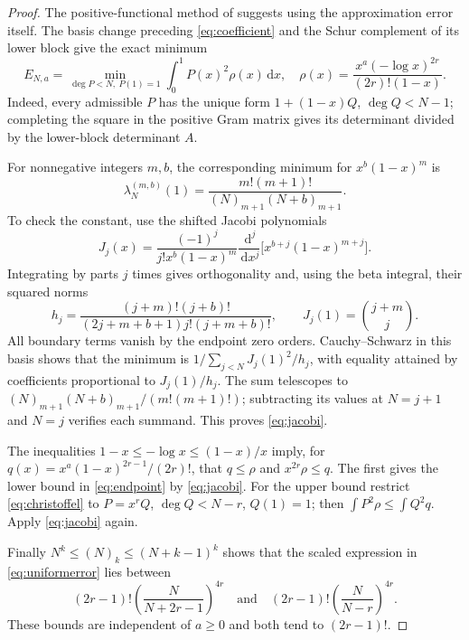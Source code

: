 \documentclass[11pt]{article}
\newcommand{\dd}{\,\mathrm{d}}
\begin{document}
\begin{proof}
The positive-functional method of \cite{Ferguson} suggests using the
approximation error itself. The basis change preceding \eqref{eq:coefficient}
and the Schur complement of its lower block give the exact minimum
\begin{equation}
 E_{N,a}=\min_{\deg P<N,\ P(1)=1}\int_0^1P(x)^2\rho(x)\dd x,
 \quad\rho(x)=\frac{x^a(-\log x)^{2r}}{(2r)!(1-x)}.
 \label{eq:christoffel}
\end{equation}
Indeed, every admissible $P$ has the unique form $1+(1-x)Q$,
$\deg Q<N-1$; completing the square in the positive Gram matrix gives
its determinant divided by the lower-block determinant $A$.

For nonnegative integers $m,b$, the corresponding minimum for
$x^b(1-x)^m$ is
\begin{equation}
 \lambda_N^{(m,b)}(1)=\frac{m!(m+1)!}{(N)_{m+1}(N+b)_{m+1}}.
 \label{eq:jacobi}
\end{equation}
To check the constant, use the shifted Jacobi polynomials
\[
 J_j(x)=\frac{(-1)^j}{j!x^b(1-x)^m}
       \frac{\dd^j}{\dd x^j}\bigl[x^{b+j}(1-x)^{m+j}\bigr].
\]
Integrating by parts $j$ times gives orthogonality and, using the beta
integral, their squared norms
\[
 h_j=\frac{(j+m)!(j+b)!}{(2j+m+b+1)j!(j+m+b)!},
 \qquad J_j(1)=\binom{j+m}{j}.
\]
All boundary terms vanish by the endpoint zero orders. Cauchy--Schwarz in
this basis shows that the minimum is $1/\sum_{j<N}J_j(1)^2/h_j$,
with equality attained by coefficients proportional to $J_j(1)/h_j$.
The sum telescopes to
$(N)_{m+1}(N+b)_{m+1}/(m!(m+1)!)$; subtracting its values at $N=j+1$
and $N=j$ verifies each summand. This proves \eqref{eq:jacobi}.

The inequalities $1-x\le-\log x\le(1-x)/x$ imply, for
$q(x)=x^a(1-x)^{2r-1}/(2r)!$, that
$q\le\rho$ and $x^{2r}\rho\le q$.
The first gives the lower bound in \eqref{eq:endpoint} by
\eqref{eq:jacobi}. For the upper bound restrict \eqref{eq:christoffel}
to $P=x^rQ$, $\deg Q<N-r$, $Q(1)=1$; then
$\int P^2\rho\le\int Q^2q$. Apply \eqref{eq:jacobi} again.

Finally $N^k\le(N)_k\le(N+k-1)^k$ shows that the scaled expression in
\eqref{eq:uniformerror} lies between
\[
 (2r-1)!\left(\frac N{N+2r-1}\right)^{4r}
 \quad\text{and}\quad
 (2r-1)!\left(\frac N{N-r}\right)^{4r}.
\]
These bounds are independent of $a\ge0$ and both tend to $(2r-1)!$.
\end{proof}
\end{document}
